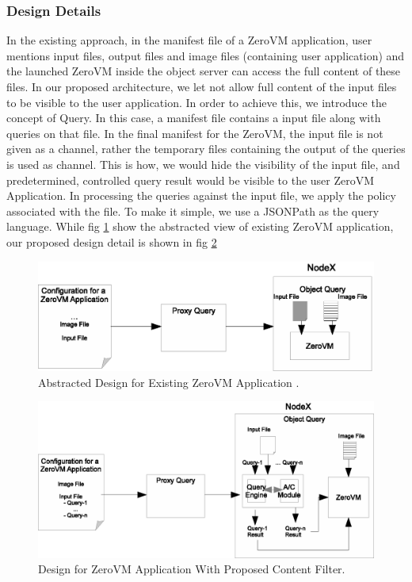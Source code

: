 \begin{appendices}
\subsubsection{Design Details} 
In the existing approach, in the manifest file of a ZeroVM application, user mentions input files, output files and image files (containing user application) and the launched ZeroVM inside the object server can access the full content of these files. In our proposed architecture, we let not allow full content of the input files to be visible to the user application. In order to achieve this, we introduce the concept of Query. In this case,  a manifest file contains a input file along with queries on that file.  In the final manifest for the ZeroVM, the input file is not given as a channel, rather the temporary files containing the output of the queries is used as channel. This is how, we would hide the visibility of the input file, and predetermined, controlled query result would be visible to the user ZeroVM Application. In processing the queries against the input file, we apply the policy associated with the  file. To make it simple, we use a JSONPath as the query language. While fig \ref{fig:abstracted-zapp} show the abstracted view of existing ZeroVM application, our proposed design detail is shown in fig \ref{fig:proposed-zapp}

\begin{figure}[t]
\centering
\includegraphics {eps/abstracted-zapp}
\caption{Abstracted Design for Existing ZeroVM Application .}
\label{fig:abstracted-zapp}
\end{figure}

\begin{figure}[t]
\centering
\includegraphics {eps/proposed-zapp}
\caption{Design for ZeroVM Application With Proposed Content Filter.}
\label{fig:proposed-zapp}
\end{figure}


\end{appendices}
